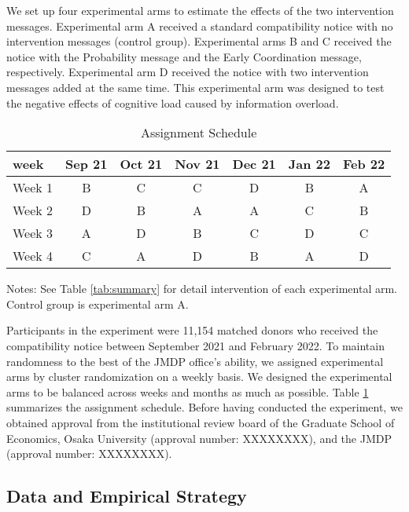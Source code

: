 \documentclass[
  lualatex,
  11pt,
  a4paper
]{article}
\begin{document}
We set up four experimental arms to estimate the effects of the two intervention messages. Experimental arm A received a standard compatibility notice with no intervention messages (control group). Experimental arms B and C received the notice with the Probability message and the Early Coordination message, respectively. Experimental arm D received the notice with two intervention messages added at the same time. This experimental arm was designed to test the negative effects of cognitive load caused by information overload.

\begin{table}

\caption{\label{tab:assignment}Assignment Schedule}
\centering
\fontsize{9}{11}\selectfont
\fontsize{9}{11}\selectfont
\begin{threeparttable}
\begin{tabular}[t]{lcccccc}
\toprule
week & Sep 21 & Oct 21 & Nov 21 & Dec 21 & Jan 22 & Feb 22\\
\midrule
Week 1 & B & C & C & D & B & A\\
Week 2 & D & B & A & A & C & B\\
Week 3 & A & D & B & C & D & C\\
Week 4 & C & A & D & B & A & D\\
\bottomrule
\end{tabular}
\begin{tablenotes}
\item Notes: See Table \ref{tab:summary} for detail intervention of each experimental arm. Control group is experimental arm A.
\end{tablenotes}
\end{threeparttable}
\end{table}

Participants in the experiment were 11,154 matched donors who received the compatibility notice between September 2021 and February 2022. To maintain randomness to the best of the JMDP office's ability, we assigned experimental arms by cluster randomization on a weekly basis. We designed the experimental arms to be balanced across weeks and months as much as possible. Table \ref{tab:assignment} summarizes the assignment schedule. Before having conducted the experiment, we obtained approval from the institutional review board of the Graduate School of Economics, Osaka University (approval number: XXXXXXXX), and the JMDP (approval number: XXXXXXXX).

\hypertarget{data-and-empirical-strategy}{%
\subsection{Data and Empirical Strategy}\label{data-and-empirical-strategy}}
\end{document}
